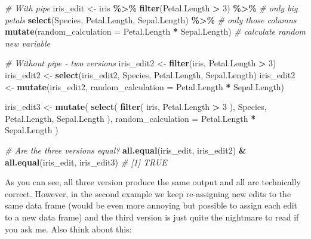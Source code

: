 \documentclass[
]{book}
\newenvironment{Shaded}{\begin{snugshade}}{\end{snugshade}}
\newcommand{\AttributeTok}[1]{\textcolor[rgb]{0.13,0.29,0.53}{#1}}
\newcommand{\CommentTok}[1]{\textcolor[rgb]{0.56,0.35,0.01}{\textit{#1}}}
\newcommand{\DecValTok}[1]{\textcolor[rgb]{0.00,0.00,0.81}{#1}}
\newcommand{\FunctionTok}[1]{\textcolor[rgb]{0.13,0.29,0.53}{\textbf{#1}}}
\newcommand{\NormalTok}[1]{#1}
\newcommand{\OtherTok}[1]{\textcolor[rgb]{0.56,0.35,0.01}{#1}}
\newcommand{\SpecialCharTok}[1]{\textcolor[rgb]{0.81,0.36,0.00}{\textbf{#1}}}
\begin{document}
\begin{Shaded}
\begin{Highlighting}[]
\CommentTok{\# With pipe}
\NormalTok{iris\_edit }\OtherTok{\textless{}{-}}\NormalTok{ iris }\SpecialCharTok{\%\textgreater{}\%}
 \FunctionTok{filter}\NormalTok{(Petal.Length }\SpecialCharTok{\textgreater{}} \DecValTok{3}\NormalTok{) }\SpecialCharTok{\%\textgreater{}\%} \CommentTok{\# only big petals}
 \FunctionTok{select}\NormalTok{(Species, Petal.Length, Sepal.Length) }\SpecialCharTok{\%\textgreater{}\%}  \CommentTok{\# only those columns}
 \FunctionTok{mutate}\NormalTok{(}\AttributeTok{random\_calculation =}\NormalTok{ Petal.Length }\SpecialCharTok{*}\NormalTok{ Sepal.Length) }\CommentTok{\# calculate random new variable}

\CommentTok{\# Without pipe {-} two versions }
\NormalTok{iris\_edit2 }\OtherTok{\textless{}{-}} \FunctionTok{filter}\NormalTok{(iris, Petal.Length }\SpecialCharTok{\textgreater{}} \DecValTok{3}\NormalTok{)}
\NormalTok{iris\_edit2 }\OtherTok{\textless{}{-}} \FunctionTok{select}\NormalTok{(iris\_edit2, Species, Petal.Length, Sepal.Length)}
\NormalTok{iris\_edit2 }\OtherTok{\textless{}{-}} \FunctionTok{mutate}\NormalTok{(iris\_edit2, }\AttributeTok{random\_calculation =}\NormalTok{ Petal.Length }\SpecialCharTok{*}\NormalTok{ Sepal.Length)}

\NormalTok{iris\_edit3 }\OtherTok{\textless{}{-}} \FunctionTok{mutate}\NormalTok{(}
  \FunctionTok{select}\NormalTok{(}
    \FunctionTok{filter}\NormalTok{(}
\NormalTok{      iris, Petal.Length }\SpecialCharTok{\textgreater{}} \DecValTok{3}
\NormalTok{    ),}
\NormalTok{    Species, Petal.Length, Sepal.Length}
\NormalTok{  ), }
  \AttributeTok{random\_calculation =}\NormalTok{ Petal.Length }\SpecialCharTok{*}\NormalTok{ Sepal.Length}
\NormalTok{)}

\CommentTok{\# Are the three versions equal?}
\FunctionTok{all.equal}\NormalTok{(iris\_edit, iris\_edit2) }\SpecialCharTok{\&} \FunctionTok{all.equal}\NormalTok{(iris\_edit, iris\_edit3)}
\CommentTok{\# [1] TRUE}
\end{Highlighting}
\end{Shaded}

As you can see, all three version produce the same output and all are technically correct.
However, in the second example we keep re-assigning new edits to the same data frame (would be even more annoying but possible to assign each edit to a new data frame) and the third version is just quite the nightmare to read if you ask me.
Also think about this:
\end{document}
